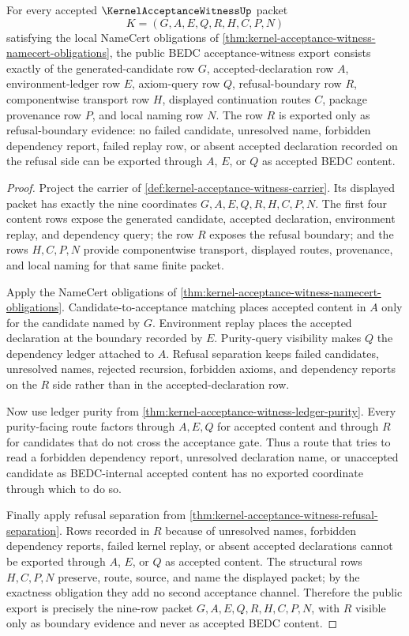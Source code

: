 \begin{theorem}
\label{thm:kernel-acceptance-witness-public-export-package}
For every accepted $\KernelAcceptanceWitnessUp$ packet
$$
K=(G,A,E,Q,R,H,C,P,N)
$$
satisfying the local NameCert obligations of \autoref{thm:kernel-acceptance-witness-namecert-obligations}, the public BEDC acceptance-witness export consists exactly of the generated-candidate row $G$, accepted-declaration row $A$, environment-ledger row $E$, axiom-query row $Q$, refusal-boundary row $R$, componentwise transport row $H$, displayed continuation routes $C$, package provenance row $P$, and local naming row $N$. The row $R$ is exported only as refusal-boundary evidence: no failed candidate, unresolved name, forbidden dependency report, failed replay row, or absent accepted declaration recorded on the refusal side can be exported through $A$, $E$, or $Q$ as accepted BEDC content.
\end{theorem}
\begin{proof}
Project the carrier of \autoref{def:kernel-acceptance-witness-carrier}. Its displayed packet has exactly the nine coordinates $G,A,E,Q,R,H,C,P,N$. The first four content rows expose the generated candidate, accepted declaration, environment replay, and dependency query; the row $R$ exposes the refusal boundary; and the rows $H,C,P,N$ provide componentwise transport, displayed routes, provenance, and local naming for that same finite packet.

Apply the NameCert obligations of \autoref{thm:kernel-acceptance-witness-namecert-obligations}. Candidate-to-acceptance matching places accepted content in $A$ only for the candidate named by $G$. Environment replay places the accepted declaration at the boundary recorded by $E$. Purity-query visibility makes $Q$ the dependency ledger attached to $A$. Refusal separation keeps failed candidates, unresolved names, rejected recursion, forbidden axioms, and dependency reports on the $R$ side rather than in the accepted-declaration row.

Now use ledger purity from \autoref{thm:kernel-acceptance-witness-ledger-purity}. Every purity-facing route factors through $A,E,Q$ for accepted content and through $R$ for candidates that do not cross the acceptance gate. Thus a route that tries to read a forbidden dependency report, unresolved declaration name, or unaccepted candidate as BEDC-internal accepted content has no exported coordinate through which to do so.

Finally apply refusal separation from \autoref{thm:kernel-acceptance-witness-refusal-separation}. Rows recorded in $R$ because of unresolved names, forbidden dependency reports, failed kernel replay, or absent accepted declarations cannot be exported through $A$, $E$, or $Q$ as accepted content. The structural rows $H,C,P,N$ preserve, route, source, and name the displayed packet; by the exactness obligation they add no second acceptance channel. Therefore the public export is precisely the nine-row packet $G,A,E,Q,R,H,C,P,N$, with $R$ visible only as boundary evidence and never as accepted BEDC content.
\end{proof}
